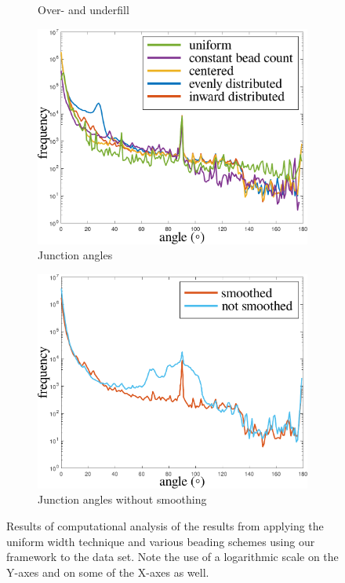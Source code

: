 \begin{figure}
\begin{subfigure}{\figwidth}
\caption{Over- and underfill}
\label{over_underfill}
\end{subfigure}
\begin{subfigure}{\figwidth}\centering
\includegraphics[height=\figheight]{sources/validation/smoothness.pdf}
\caption{Junction angles}
\label{smoothness}
\end{subfigure}
\begin{subfigure}{\figwidth}\centering
\includegraphics[height=\figheight]{sources/validation/smoothnessNoTransition.pdf}
\caption{Junction angles without smoothing}
\label{smoothnessNoTransition}
\end{subfigure}


\caption{
Results of computational analysis of the results from applying the uniform width technique and various beading schemes using our framework to the data set.
Note the use of a logarithmic scale on the Y-axes and on some of the X-axes as well.
}
\end{figure}
